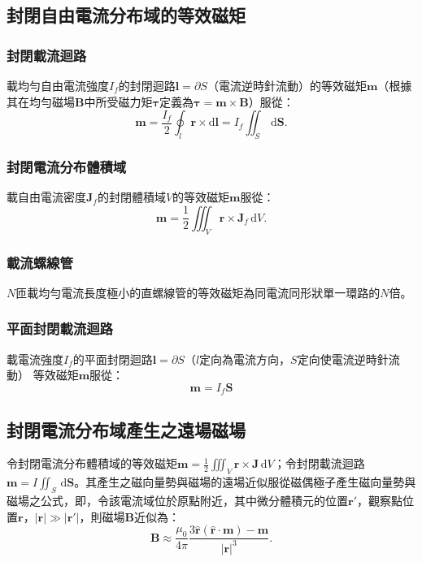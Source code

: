 \documentclass[a4paper,12pt]{report}
\begin{document}
\begin{itemize}
\subsection{封閉自由電流分布域的等效磁矩}
\subsubsection{封閉載流迴路}
載均勻自由電流強度$I_f$的封閉迴路$\mathbf{l}=\partial S$（電流逆時針流動）的等效磁矩$\mathbf{m}$（根據其在均勻磁場$\mathbf{B}$中所受磁力矩$\boldsymbol{\tau}$定義為$\boldsymbol{\tau}=\mathbf{m}\times\mathbf{B}$）服從：
\[\mathbf{m}=\frac{I_f}{2}\oint_l\mathbf{r}\times\mathrm{d}\mathbf{l}=I_f\iint_S\,\mathrm{d}\mathbf{S}.\]
\subsubsection{封閉電流分布體積域}
載自由電流密度$\mathbf{J}_f$的封閉體積域$V$的等效磁矩$\mathbf{m}$服從：
\[\mathbf{m}=\frac{1}{2}\iiint_V\mathbf{r}\times\mathbf{J}_f\,\mathrm{d}V.\]
\subsubsection{載流螺線管}
$N$匝載均勻電流長度極小的直螺線管的等效磁矩為同電流同形狀單一環路的$N$倍。
\subsubsection{平面封閉載流迴路}
載電流強度$I_f$的平面封閉迴路$\mathbf{l}=\partial S$（$l$定向為電流方向，$S$定向使電流逆時針流動）  等效磁矩$\mathbf{m}$服從：
\[\mathbf{m}=I_f\mathbf{S}\]
\subsection{封閉電流分布域產生之遠場磁場}
令封閉電流分布體積域的等效磁矩$\mathbf{m}=\frac{1}{2}\iiint_V\mathbf{r}\times\mathbf{J}\,\mathrm{d}V$；令封閉載流迴路$\mathbf{m}=I\iint_S\,\mathrm{d}\mathbf{S}$。其產生之磁向量勢與磁場的遠場近似服從磁偶極子產生磁向量勢與磁場之公式，即，令該電流域位於原點附近，其中微分體積元的位置$\mathbf{r}'$，觀察點位置$\mathbf{r}$，$|\mathbf{r}|\gg |\mathbf{r}'|$，則磁場$\mathbf{B}$近似為：
\[\mathbf{B}\approx\frac{\mu_0}{4\pi}\frac{3\hat{\mathbf{r}}\left(\hat{\mathbf{r}}\cdot\mathbf{m}\right)-\mathbf{m}}{|\mathbf{r}|^3}.\]

\end{itemize}
\end{document}

